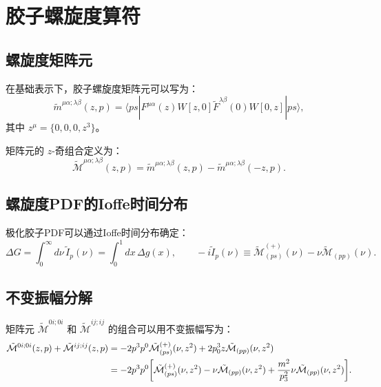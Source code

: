 \documentclass[11pt,a4paper]{article}
\begin{document}
\section{胶子螺旋度算符}

\subsection{螺旋度矩阵元}

在基础表示下，胶子螺旋度矩阵元可以写为：
\begin{equation}\label{eq:m_helicity}
    \tilde{m}^{\mu\alpha;\lambda\beta}(z,p) = \langle p s | F^{\mu\alpha}(z) W[z,0] \tilde{F}^{\lambda\beta}(0) W[0,z] | p s \rangle,
\end{equation}
其中 $z^\mu = \{0, 0, 0, z^3\}$。

矩阵元的 $z$-奇组合定义为\cite{Egerer:2022rfj}：
\begin{equation}\label{eq:M_tilde}
    \tilde{\mathcal{M}}^{\mu\alpha;\lambda\beta}(z,p) = \tilde{m}^{\mu\alpha;\lambda\beta}(z,p) - \tilde{m}^{\mu\alpha;\lambda\beta}(-z,p).
\end{equation}

\subsection{螺旋度PDF的Ioffe时间分布}

极化胶子PDF可以通过Ioffe时间分布确定\cite{Egerer:2022rfj}：
\begin{equation}\label{eq:helicity_Ioffe}
    \Delta G = \int_0^\infty d\nu \, \tilde{I}_p(\nu) = \int_0^1 dx \, \Delta g(x), \qquad -i \tilde{I}_p(\nu) \equiv \tilde{\mathcal{M}}^{(+)}_{(ps)}(\nu) - \nu \tilde{\mathcal{M}}_{(pp)}(\nu).
\end{equation}

\subsection{不变振幅分解}

矩阵元 $\tilde{\mathcal{M}}^{0i;0i}$ 和 $\tilde{\mathcal{M}}^{ij;ij}$ 的组合可以用不变振幅写为：
\begin{align}
    \tilde{\mathcal{M}}^{0i;0i}(z,p) + \tilde{\mathcal{M}}^{ij;ij}(z,p) &= -2p^3 p^0 \tilde{\mathcal{M}}^{(+)}_{(ps)}(\nu, z^2) + 2p_0^3 z \tilde{\mathcal{M}}_{(pp)}(\nu, z^2) \nonumber\\
    &= -2p^3 p^0 \qty[\tilde{\mathcal{M}}^{(+)}_{(ps)}(\nu, z^2) - \nu \tilde{\mathcal{M}}_{(pp)}(\nu, z^2) + \frac{m^2}{p_3^2} \nu \tilde{\mathcal{M}}_{(pp)}(\nu, z^2)].
\end{align}
\end{document}
